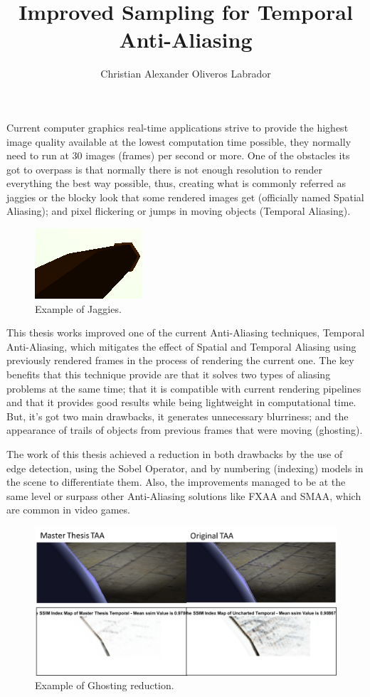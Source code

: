 \documentclass{popsci}
\author{Christian Alexander Oliveros Labrador}
\title{Improved Sampling for Temporal Anti-Aliasing}
\begin{document}


{\noindent Current computer graphics real-time applications strive to provide the highest image quality available at the lowest computation time possible, they normally need to run at 30 images (frames) per second or more. One of the obstacles its got to overpass is that normally there is not enough resolution to render everything the best way possible, thus, creating what is commonly referred as jaggies or the blocky look that some rendered images get (officially named Spatial Aliasing); and pixel flickering or jumps in moving objects (Temporal Aliasing). 
	
\begin{figure}[!hbt]
	\centering
	\includegraphics[scale=0.87]{images/pipe_sobel_no_aa.png}
	\caption{Example of Jaggies.}\label{fig:jaggies}
\end{figure}
	
This thesis works improved one of the current Anti-Aliasing techniques, Temporal Anti-Aliasing, which mitigates the effect of Spatial and Temporal Aliasing using previously rendered frames in the process of rendering the current one. The key benefits that this technique provide are that it solves two types of aliasing problems at the same time; that it is compatible with current rendering pipelines and that it provides good results while being lightweight in computational time. But, it’s got two main drawbacks, it generates unnecessary blurriness; and the appearance of trails of objects from previous frames that were moving (ghosting). 

The work of this thesis achieved a reduction in both drawbacks by the use of edge detection, using the Sobel Operator, and by numbering (indexing) models in the scene to differentiate them. Also, the improvements managed to be at the same level or surpass other Anti-Aliasing solutions like FXAA and SMAA, which are common in video games.


\begin{figure}[!hbt]
	\centering
	\includegraphics[scale=0.6]{images/ghosting.png}
	\caption{Example of Ghosting reduction.}\label{fig:ghosting}
\end{figure}
	
}
\end{document}

